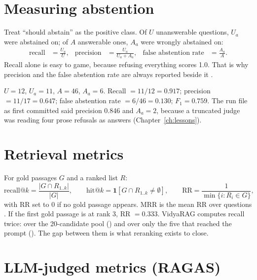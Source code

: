 \section{Measuring abstention}
\label{sec:abstention-metrics}

Treat ``should abstain'' as the positive class. Of $U$ unanswerable questions, $U_a$ were abstained on; of $A$ answerable ones, $A_a$ were wrongly abstained on:
\begin{align}
\text{recall} &= \tfrac{U_a}{U}, &
\text{precision} &= \tfrac{U_a}{U_a+A_a}, &
\text{false abstention rate} &= \tfrac{A_a}{A}.
\end{align}
Recall alone is easy to game, because refusing everything scores 1.0. That is why precision and the false abstention rate are always reported beside it .

\begin{example}
$U=12$, $U_a=11$, $A=46$, $A_a=6$. Recall $=11/12=0.917$; precision $=11/17=0.647$; false abstention rate $=6/46=0.130$; $F_1=0.759$. The run file as first committed said precision 0.846 and $A_a=2$, because a truncated judge was reading four prose refusals as answers (Chapter~\ref{ch:lessons}).
\end{example}

\section{Retrieval metrics}
\label{sec:ir-metrics}

For gold passages $G$ and a ranked list $R$:
\begin{equation}
\text{recall@}k=\frac{|G\cap R_{1..k}|}{|G|},\qquad
\text{hit@}k=\mathbf{1}[G\cap R_{1..k}\neq\emptyset],\qquad
\text{RR}=\frac{1}{\min\{i: R_i\in G\}},
\end{equation}
with RR set to $0$ if no gold passage appears. MRR is the mean RR over questions . If the first gold passage is at rank 3, RR $=0.333$. VidyaRAG computes recall twice: over the 20-candidate pool () and over only the five that reached the prompt (). The gap between them is what reranking exists to close.

\section{LLM-judged metrics (RAGAS)}

